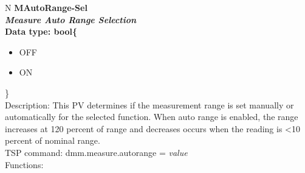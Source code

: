 \documentclass[openany]{article}
\begin{document}
		\begin{tabular}{N}
			\hline
			\bfseries MAutoRange-Sel\label{pv:mautorange-sel} \\ \hline
			\emph{Measure Auto Range Selection} \\
			Data type: bool\{\begin{itemize}[noitemsep]
				\small
				\item[] OFF
				\item[] ON
			\end{itemize}\} \\
			Description: This PV determines if the measurement range is set manually or automatically for the selected function. When auto range is enabled, the range increases at 120 percent of range and decreases occurs when the reading is \textless 10 percent of nominal range. \\
			TSP command: dmm.measure.autorange = \emph{value} \\
			Functions: \\
			\arrayrulecolor{\FuncTableBorderColor}

		\end{tabular}
\end{document}
